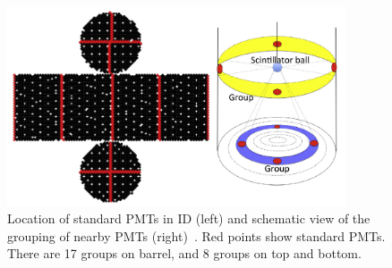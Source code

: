 \begin{figure}[h]
	\centering
	\includegraphics[width=10cm]{Figures/Calibration/CalibPMT}
	\caption[Location of standard PMTs in ID and schematic view of the grouping of nearby PMTs]{
	Location of standard PMTs in ID (left) and schematic view of the grouping of nearby PMTs (right)~\cite{2014AbeCalib}.
	Red points show standard PMTs. There are 17 groups on barrel, and 8 groups on top and bottom.
	}\label{Calibration_CalibPMT}
\end{figure}

